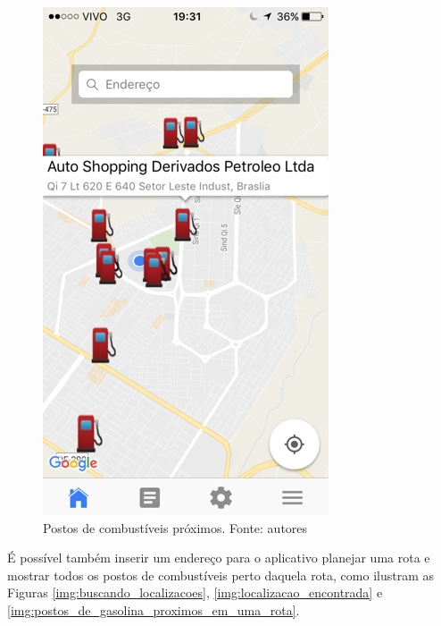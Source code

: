 \begin{figure}[H]
    \centering
    \includegraphics[scale=0.5]{figuras/app_2.jpg}
    \caption[Postos de combustíveis próximos]{Postos de combustíveis próximos. Fonte: autores}
    \label{img:postos_de_gasolina_proximos}
\end{figure}

É possível também inserir um endereço para o aplicativo planejar uma rota e mostrar todos os postos de combustíveis perto daquela rota, como ilustram as Figuras \ref{img:buscando_localizacoes}, \ref{img:localizacao_encontrada} e \ref{img:postos_de_gasolina_proximos_em_uma_rota}.

